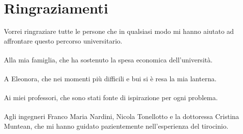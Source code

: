 \chapter*{Ringraziamenti}

Vorrei ringraziare tutte le persone che in qualsiasi modo mi hanno aiutato
ad affrontare questo percorso universitario.
\\
\\
Alla mia famiglia, che ha sostenuto la spesa economica dell'università.
\\
\\
A Eleonora, che nei momenti più difficili e bui si è resa la mia lanterna.
\\
\\
Ai miei professori, che sono stati fonte di ispirazione per ogni
problema.
\\
\\
Agli ingegneri Franco Maria Nardini, Nicola Tonellotto e la dottoressa
Cristina Muntean, che mi hanno guidato pazientemente nell'esperienza
del tirocinio.
